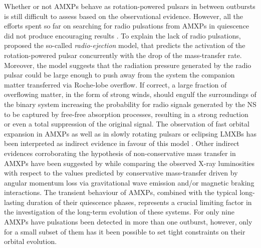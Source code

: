 \documentclass[fleqn,usenatbib]{mnras}
\begin{document}
Whether or not AMXPs behave as rotation-powered pulsars in between outbursts is still difficult to assess based on the observational evidence. However, all the efforts spent so far on searching for radio pulsations from AMXPs in quiescence did not produce encouraging results \citep[see e.g.,][]{Burgay:2003va,Patruno:2017ug,Sanna:2018td}. To explain the lack of radio pulsations, \citet{Burderi:2001wp} proposed the so-called \textit{radio-ejection} model, that predicts the activation of the rotation-powered pulsar concurrently with the drop of the mass-transfer rate. Moreover, the model suggests that the radiation pressure generated by the radio pulsar could be large enough to push away from the system the companion matter transferred via Roche-lobe overflow. If correct, a large fraction of overflowing matter, in the form of strong winds, should engulf the surroundings of the binary system increasing the probability for radio signals generated by the NS to be captured by free-free absorption processes, resulting in a strong reduction or even a total suppression of the original signal. The observation of fast orbital expansion in AMXPs \citep[see e.g.,][]{di-Salvo:2008uu,Burderi:2009td,Sanna:2016ty,Sanna:2017vj} as well as in slowly rotating pulsars or eclipsing LMXBs \citep[see e.g.,][]{Burderi:2010tk,Mazzola:2019wo,Iaria:2018tq} has been interpreted as indirect evidence in favour of this model \citep[however, see e.g.,][for alternative explanations]{Hartman:2008uj,Patruno:2012tw,Patruno:2017ug}. Other indirect evidences corroborating the hypothesis of non-conservative mass transfer in AMXPs have been suggested by \citet{Marino:2019vq} while comparing the observed X-ray luminosities with respect to the values predicted by conservative mass-transfer driven by angular momentum loss via gravitational wave emission and/or magnetic braking interactions. 
The transient behaviour of AMXPs, combined with the typical long-lasting duration of their quiescence phases, represents a crucial limiting factor in the investigation of the long-term evolution of these systems. For only nine AMXPs have pulsations been detected in more than one outburst, however, only for a small subset of them has it been possible to set tight constraints on their orbital evolution.
\end{document}
